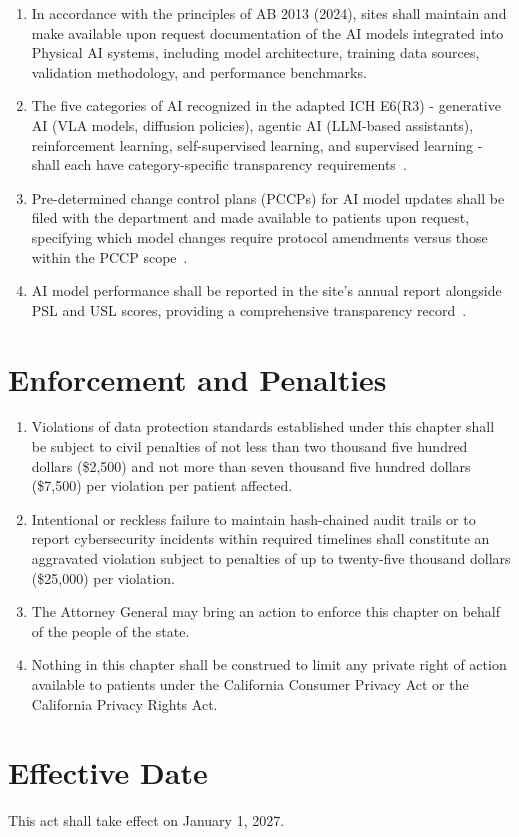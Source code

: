 \begin{enumerate}[label=(\alph*)]
\item In accordance with the principles of AB 2013 (2024), sites shall maintain
  and make available upon request documentation of the AI models integrated
  into Physical AI systems, including model architecture, training data
  sources, validation methodology, and performance benchmarks.

\item The five categories of AI recognized in the adapted ICH E6(R3) -
  generative AI (VLA models, diffusion policies), agentic AI (LLM-based
  assistants), reinforcement learning, self-supervised learning, and
  supervised learning - shall each have category-specific transparency
  requirements~\cite{iche6r3adapt}.

\item Pre-determined change control plans (PCCPs) for AI model updates shall be
  filed with the department and made available to patients upon request,
  specifying which model changes require protocol amendments versus those
  within the PCCP scope~\cite{cfr312adapt}.

\item AI model performance shall be reported in the site's annual report
  alongside PSL and USL scores, providing a comprehensive transparency
  record~\cite{cfr312adapt}.
\end{enumerate}

\section{Enforcement and Penalties}

\begin{enumerate}[label=(\alph*)]
\item Violations of data protection standards established under this chapter
  shall be subject to civil penalties of not less than two thousand five
  hundred dollars (\$2,500) and not more than seven thousand five hundred
  dollars (\$7,500) per violation per patient affected.

\item Intentional or reckless failure to maintain hash-chained audit trails or
  to report cybersecurity incidents within required timelines shall constitute
  an aggravated violation subject to penalties of up to twenty-five thousand
  dollars (\$25,000) per violation.

\item The Attorney General may bring an action to enforce this chapter on behalf
  of the people of the state.

\item Nothing in this chapter shall be construed to limit any private right of
  action available to patients under the California Consumer Privacy Act or
  the California Privacy Rights Act.
\end{enumerate}

\section{Effective Date}

This act shall take effect on January 1, 2027.

